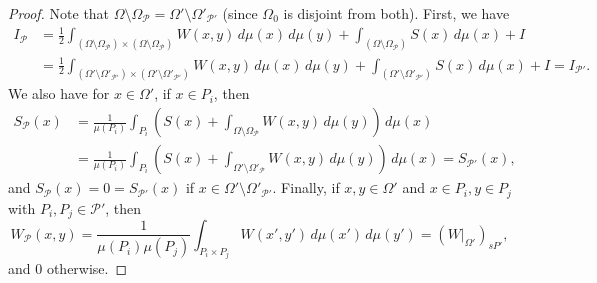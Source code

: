 \documentclass{amsart}
\numberwithin{equation}{section}
\numberwithin{figure}{section}
\theoremstyle{definition}
\theoremstyle{remark}
\newcommand{\cP}{\mathcal{P}}
\newcommand{\sP}{\mathscr{P}}
\begin{document}
\begin{proof}
Note that $\Omega \setminus \Omega_\sP=\Omega' \setminus \Omega'_{\sP'}$
(since $\Omega_0$ is disjoint from both). First, we have
\begin{align*}
I_\sP&= \frac{1}{2}\int_{(\Omega \setminus \Omega_{\sP})\times (\Omega \setminus \Omega_{\sP})} W(x,y)\,d\mu(x) \,d\mu(y) + \int_{(\Omega \setminus \Omega_{\sP})}S(x)\,d\mu(x)+I\\
&=\frac{1}{2}\int_{(\Omega' \setminus \Omega'_{\sP'})\times (\Omega' \setminus \Omega'_{\sP'})} W(x,y)\,d\mu(x) \,d\mu(y) + \int_{(\Omega' \setminus \Omega'_{\sP'})}S(x)\,d\mu(x)+I=I_{\sP'}.
\end{align*}
We also have for $x \in \Omega'$, if $x \in P_i$, then
\begin{align*}
S_{\sP}(x)&=\frac{1}{\mu(P_i)}\int_{P_i} \left(S(x)+\int_{\Omega \setminus \Omega_{\sP}}W(x,y)\,d\mu(y) \right)\,d\mu(x)\\
&=\frac{1}{\mu(P_i)}\int_{P_i} \left(S(x)+\int_{\Omega' \setminus \Omega'_{\sP}}W(x,y)\,d\mu(y) \right)\,d\mu(x)=S_{\sP'}(x),
\end{align*}
and $S_{\sP}(x)=0=S_{\sP'}(x)$ if $x \in \Omega' \setminus \Omega'_{\sP'}$.
Finally, if $x,y \in \Omega'$ and $x \in P_i,y \in P_j$ with $P_i,P_j \in
\cP'$, then
\[
W_{\sP}(x,y)=\frac1{\mu(P_i)\mu(P_j)}\int_{P_i \times P_j}W(x',y')\,d\mu(x')\,d\mu(y')=(W|_{\Omega'})_{sP'},
\] and
$0$ otherwise.
\end{proof}
\end{document}
